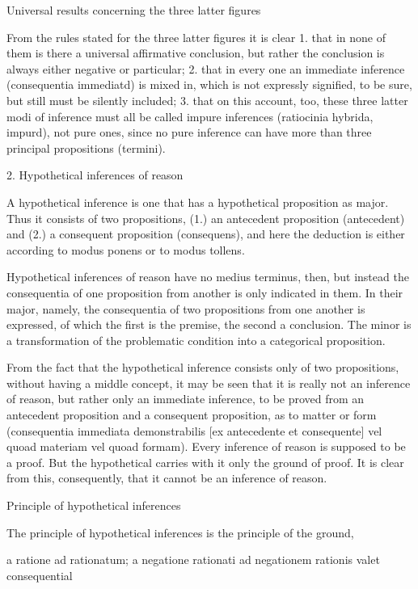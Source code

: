Universal results concerning the three latter figures

From the rules stated for the three latter figures it is clear
1. that in none of them is there a universal affirmative conclusion, but rather the
conclusion is always either negative or particular;
2. that in every one an immediate inference (consequentia immediatd) is mixed in,
which is not expressly signified, to be sure, but still must be silently included;
3. that on this account, too, these three latter modi of inference must all be called
impure inferences (ratiocinia hybrida, impurd), not pure ones,
since no pure inference can have more than three principal propositions (termini).

2. Hypothetical inferences of reason

A hypothetical inference is one that has a hypothetical proposition as major.
Thus it consists of two propositions,
(1.) an antecedent proposition (antecedent) and
(2.) a consequent proposition (consequens), and
here the deduction is either according to modus ponens or to modus tollens.

    Hypothetical inferences of reason have no medius terminus, then, but instead
    the consequentia of one proposition from another is only indicated in them.
    In their major, namely, the consequentia of two propositions from one another
    is expressed, of which the first is the premise, the second a conclusion.
    The minor is a transformation of the problematic condition into a categorical proposition.

    From the fact that the hypothetical inference consists only of two propositions,
    without having a middle concept, it may be seen that it is really
    not an inference of reason, but rather only an immediate inference,
    to be proved from an antecedent proposition and a consequent proposition,
    as to matter or form (consequentia immediata demonstrabilis [ex antecedente et
    consequente] vel quoad materiam vel quoad formam).
    Every inference of reason is supposed to be a proof.
    But the hypothetical carries with it only the ground of proof.
    It is clear from this, consequently, that it cannot be an inference of reason.

Principle of hypothetical inferences

The principle of hypothetical inferences is
the principle of the ground,

a ratione ad rationatum; a negatione rationati ad negationem rationis valet consequential

